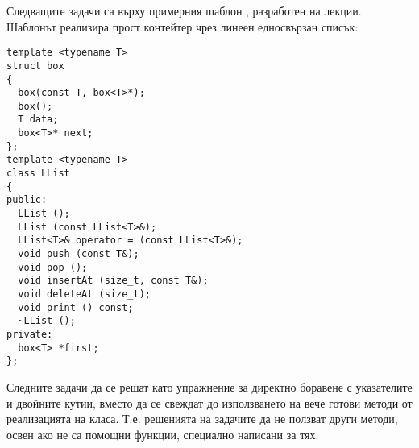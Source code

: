 \begin{mdframed}[hidealllines=true,backgroundcolor=gray!20]
Следващите задачи са върху примерния шаблон , разработен на лекции. Шаблонът реализира прост контейтер чрез линеен едносвързан списък:
\begin{verbatim}
template <typename T>
struct box
{
  box(const T, box<T>*);
  box();
  T data;
  box<T>* next;
};
template <typename T>
class LList
{
public:
  LList ();
  LList (const LList<T>&);
  LList<T>& operator = (const LList<T>&);
  void push (const T&);
  void pop ();
  void insertAt (size_t, const T&);
  void deleteAt (size_t);
  void print () const;
  ~LList ();
private:
  box<T> *first;
};

\end{verbatim}
Следните задачи да се решат като упражнение за директно боравене с указателите и двойните кутии, вместо да се свеждат до използването на вече готови методи от реализацията на класа. Т.е. решенията на задачите да не ползват други методи, освен ако не са помощни функции, специално написани за тях.
\end{mdframed}

